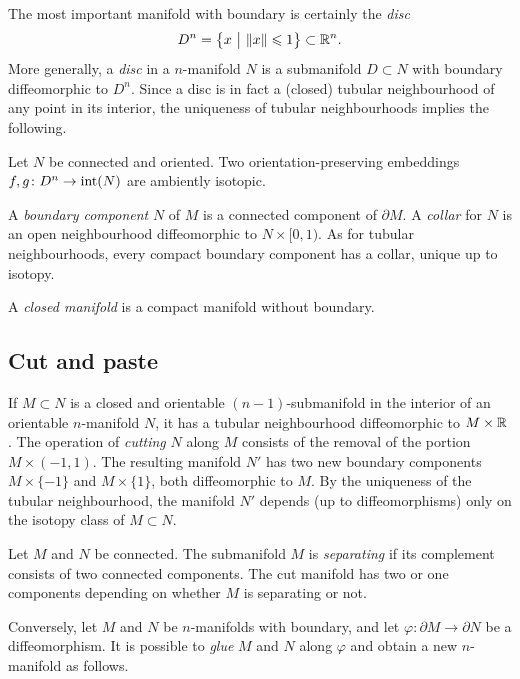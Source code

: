 The most important manifold with boundary is certainly the \emph{disc} 
$$D^n = \big\{x\ \big|\ \|x\|\leqslant 1\big\}\subset \matR^n.$$ 
More generally, a \emph{disc} in a $n$-manifold $N$ is a submanifold $D\subset N$ with boundary diffeomorphic to $D^n$. Since a disc is in fact a (closed) tubular neighbourhood of any point in its interior, the uniqueness of tubular neighbourhoods implies the following.

\begin{teo} \label{dischi:teo}
Let $N$ be connected and oriented. Two orientation-preserving embeddings $f,g\colon D^n \to {\rm int}(N)$ are ambiently isotopic.
\end{teo}

A \emph{boundary component} $N$ of $M$ is a connected component of $\partial M$. A \emph{collar} for $N$ is an open neighbourhood diffeomorphic to $N\times [0,1)$. As for tubular neighbourhoods, every compact boundary component has a collar, unique up to isotopy.

A \emph{closed manifold} is a compact manifold without boundary.

\subsection{Cut and paste} \label{cut:subsection}
If $M\subset N$ is a closed and orientable $(n-1)$-submanifold in the interior of an orientable $n$-manifold $N$, it has a tubular neighbourhood diffeomorphic to $M \times \mathbb{R}$. The operation of \emph{cutting} $N$ along $M$ consists of the removal of the portion $M\times (-1,1)$. The resulting manifold $N'$ has two new boundary components $M\times \{-1\}$ and $M\times \{1\}$, both diffeomorphic to $M$. By the uniqueness of the tubular neighbourhood, the manifold $N'$ depends (up to diffeomorphisms) only on the isotopy class of $M\subset N$.

Let $M$ and $N$ be connected. The submanifold $M$ is \emph{separating} if its complement consists of two connected components. The cut manifold has two or one components depending on whether $M$ is separating or not.

Conversely, let $M$ and $N$ be $n$-manifolds with boundary, and let $\varphi \colon \partial M \to \partial N$ be a diffeomorphism. It is possible to \emph{glue} $M$ and $N$ along $\varphi$ and obtain a new $n$-manifold as follows.

